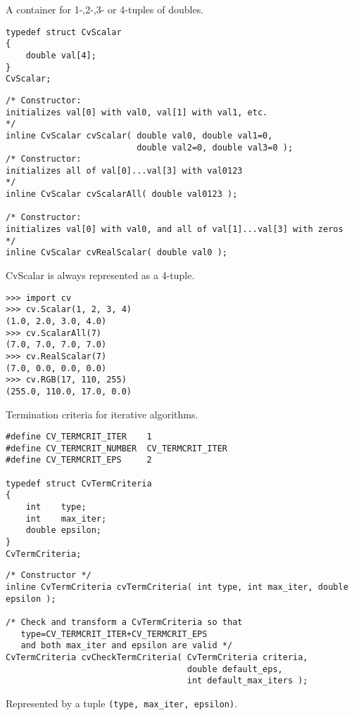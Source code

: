 \label{CvScalar}
A container for 1-,2-,3- or 4-tuples of doubles.

\ifC %
\begin{lstlisting}
typedef struct CvScalar
{
    double val[4];
}
CvScalar;
\end{lstlisting}

\begin{lstlisting}
/* Constructor: 
initializes val[0] with val0, val[1] with val1, etc. 
*/
inline CvScalar cvScalar( double val0, double val1=0,
                          double val2=0, double val3=0 );
/* Constructor: 
initializes all of val[0]...val[3] with val0123 
*/
inline CvScalar cvScalarAll( double val0123 );

/* Constructor: 
initializes val[0] with val0, and all of val[1]...val[3] with zeros 
*/
inline CvScalar cvRealScalar( double val0 );
\end{lstlisting}
\else %

CvScalar is always represented as a 4-tuple.

\begin{lstlisting}
>>> import cv
>>> cv.Scalar(1, 2, 3, 4)
(1.0, 2.0, 3.0, 4.0)
>>> cv.ScalarAll(7)
(7.0, 7.0, 7.0, 7.0)
>>> cv.RealScalar(7)
(7.0, 0.0, 0.0, 0.0)
>>> cv.RGB(17, 110, 255)
(255.0, 110.0, 17.0, 0.0)
\end{lstlisting}
\fi %

\label{CvTermCriteria}
Termination criteria for iterative algorithms.

\ifC %
\begin{lstlisting}
#define CV_TERMCRIT_ITER    1
#define CV_TERMCRIT_NUMBER  CV_TERMCRIT_ITER
#define CV_TERMCRIT_EPS     2

typedef struct CvTermCriteria
{
    int    type;
    int    max_iter; 
    double epsilon; 
}
CvTermCriteria;
\end{lstlisting}

\begin{description}
\end{description}

\begin{lstlisting}
/* Constructor */
inline CvTermCriteria cvTermCriteria( int type, int max_iter, double epsilon );

/* Check and transform a CvTermCriteria so that 
   type=CV_TERMCRIT_ITER+CV_TERMCRIT_EPS
   and both max_iter and epsilon are valid */
CvTermCriteria cvCheckTermCriteria( CvTermCriteria criteria,
                                    double default_eps,
                                    int default_max_iters );
\end{lstlisting}
\else %
Represented by a tuple \texttt{(type, max\_iter, epsilon)}.

